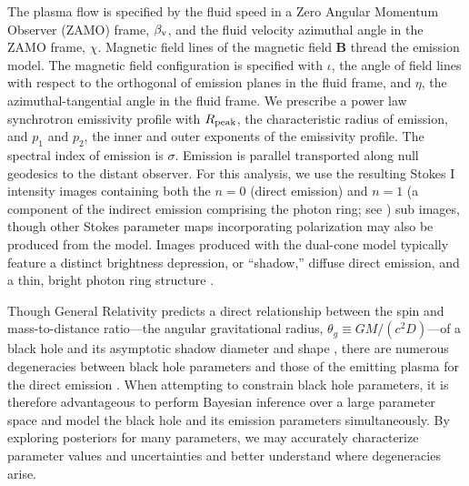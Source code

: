 \documentclass[linenumbers, twocolumn, tighten]{aastex701}
\begin{document}
The plasma flow is specified by the fluid speed in a Zero Angular Momentum Observer (ZAMO) frame, $\beta_{\rm v}$, and the fluid velocity azimuthal angle in the ZAMO frame, $\chi$. 
Magnetic field lines of the magnetic field $\mathbf{B}$ thread the emission model. The magnetic field configuration is specified with $\iota$, the angle of field lines with respect to the orthogonal of emission planes in the fluid frame, and $\eta$, the azimuthal-tangential angle in the fluid frame. We prescribe a power law synchrotron emissivity profile with $R_{\rm peak}$, the characteristic radius of emission, and $p_1$ and $p_2$, the inner and outer exponents of the emissivity profile. 
The spectral index of emission is $\sigma$. 
Emission is parallel transported along null geodesics to the distant observer.  
For this analysis, we use the resulting Stokes I intensity images containing both the $n=0$ (direct emission) and $n=1$ (a component of the indirect emission comprising the photon ring; see \citealt{Johnson2020}) sub images, though other Stokes parameter maps incorporating polarization may also be produced from the model. Images produced with the dual-cone model typically feature a distinct brightness depression, or ``shadow,'' diffuse direct emission, and a thin, bright photon ring structure \citep[for more discussion of the black hole photon ring, see, e.g.][]{Johnson2020, PhysRevD.102.044017, 2019PhRvD.100b4018G}.

Though General Relativity predicts a direct relationship between the spin and mass-to-distance ratio---the angular gravitational radius, $\theta_g \equiv GM/(c^2D)$---of a black hole and its asymptotic shadow diameter and shape \citep{1973blho.conf..215B}, there are numerous degeneracies between black hole parameters and those of the emitting plasma for the direct emission \citep[see, e.g.][]{EHT2019-V,EHT2019-VI, 2019PhRvD.100b4018G}. When attempting to constrain black hole parameters, it is therefore advantageous to perform Bayesian inference over a large parameter space and model the black hole and its emission parameters simultaneously. By exploring posteriors for many parameters, we may accurately characterize parameter values and uncertainties and better understand where degeneracies arise.
\end{document}
